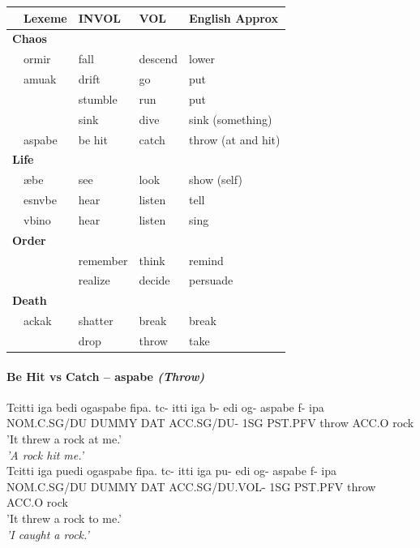 \documentclass[11pt]{article}
\begin{document}
\begin{table}[H]
\begin{tabular}{ m{1em} m{5em} | m{5em} | m{5em}| m{10em} }
& Lexeme & INVOL & VOL & English Approx \\
\hline\hline
\multicolumn{5}{l}{ \textbf{Chaos} } \\
\hline
& ormir & fall & descend & lower \\ 
& amuak & drift & go & put \\ 
&       & stumble & run & put \\
&       & sink & dive & sink (something)\\ 

& aspabe & be hit & catch & throw (at and hit) \\ 

\hline
\multicolumn{4}{l}{ \textbf{Life} } \\
\hline
& æbe    & see & look & show (self)\\ 
& esnvbe & hear & listen & tell\\ 
& vbino  & hear & listen & sing\\ 
       
\hline
\multicolumn{4}{l}{ \textbf{Order} } \\
\hline
&       & remember & think & remind \\ 
&       & realize & decide & persuade\\ 
       
\hline
\multicolumn{4}{l}{ \textbf{Death} } \\
\hline
& ackak  & shatter & break & break \\
&       & drop & throw & take\\  

\end{tabular}
\end{table}

\paragraph{Be Hit vs Catch – aspabe \textit{(Throw)}}
\begin{exe}
\ex \label{fall}
\begin{xlist}
\ex \label{fall:invol}
Tcitti iga bedi ogaspabe fipa.
\gll
tc-         itti  iga  b-         edi og-     aspabe f-    ipa\\
NOM.C.SG/DU DUMMY DAT ACC.SG/DU- 1SG PST.PFV throw  ACC.O rock\\
\trans 
    {\textthin{}'It threw a rock at me.'}\\
    \textit{'A rock hit me.'}\\

\ex \label{fall:vol}
Tcitti iga puedi ogaspabe fipa.
\gll
tc-         itti  iga  pu-            edi og-     aspabe f-    ipa\\
NOM.C.SG/DU DUMMY DAT ACC.SG/DU.VOL- 1SG PST.PFV throw  ACC.O rock\\
\trans
  {\textthin{}'It threw a rock to me.'}\\
  \textit{'I caught a rock.'}\\
\end{xlist}
\end{exe}
\end{document}
